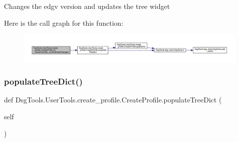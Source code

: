 \begin{DoxyVerb}Changes the edgv version and updates the tree widget
\end{DoxyVerb}
 Here is the call graph for this function\+:
\nopagebreak
\begin{figure}[H]
\begin{center}
\leavevmode
\includegraphics[width=350pt]{class_dsg_tools_1_1_user_tools_1_1create__profile_1_1_create_profile_a79a377d083c06fe91ae4b38014d14cba_cgraph}
\end{center}
\end{figure}
\mbox{\label{class_dsg_tools_1_1_user_tools_1_1create__profile_1_1_create_profile_aa323abead8349dc6a55e95f88358c7fc}} 
\subsubsection{\texorpdfstring{populate\+Tree\+Dict()}{populateTreeDict()}}
{\footnotesize\ttfamily def Dsg\+Tools.\+User\+Tools.\+create\+\_\+profile.\+Create\+Profile.\+populate\+Tree\+Dict (\begin{DoxyParamCaption}\item[{}]{self }\end{DoxyParamCaption})}


